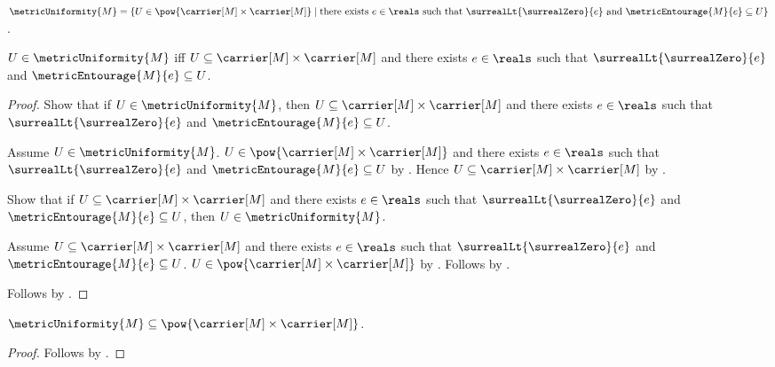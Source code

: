 \begin{definition}\label{metric_uniformity}
    $\metricUniformity{M}=
        \{U\in\pow{\carrier[M]\times\carrier[M]}\mid
            \text{there exists $e\in\reals$ such that
                $\surrealLt{\surrealZero}{e}$ and
                $\metricEntourage{M}{e}\subseteq U$}\}$.
\end{definition}

\begin{proposition}\label{metric_uniformity_iff}
    $U\in\metricUniformity{M}$ iff
        $U\subseteq\carrier[M]\times\carrier[M]$ and
        there exists $e\in\reals$ such that
            $\surrealLt{\surrealZero}{e}$ and
            $\metricEntourage{M}{e}\subseteq U$.
\end{proposition}
\begin{proof}
    Show that if $U\in\metricUniformity{M}$, then
        $U\subseteq\carrier[M]\times\carrier[M]$ and
        there exists $e\in\reals$ such that
            $\surrealLt{\surrealZero}{e}$ and
            $\metricEntourage{M}{e}\subseteq U$.
    \begin{subproof}
        Assume $U\in\metricUniformity{M}$.
        $U\in\pow{\carrier[M]\times\carrier[M]}$ and
            there exists $e\in\reals$ such that
                $\surrealLt{\surrealZero}{e}$ and
                $\metricEntourage{M}{e}\subseteq U$
            by .
        Hence $U\subseteq\carrier[M]\times\carrier[M]$
            by .
    \end{subproof}
    Show that if
        $U\subseteq\carrier[M]\times\carrier[M]$ and
        there exists $e\in\reals$ such that
            $\surrealLt{\surrealZero}{e}$ and
            $\metricEntourage{M}{e}\subseteq U$, then
        $U\in\metricUniformity{M}$.
    \begin{subproof}
        Assume
            $U\subseteq\carrier[M]\times\carrier[M]$ and
            there exists $e\in\reals$ such that
                $\surrealLt{\surrealZero}{e}$ and
                $\metricEntourage{M}{e}\subseteq U$.
        $U\in\pow{\carrier[M]\times\carrier[M]}$
            by .
        Follows by .
    \end{subproof}
    Follows by \auto.
\end{proof}

\begin{proposition}\label{metric_uniformity_type}
    $\metricUniformity{M}
        \subseteq\pow{\carrier[M]\times\carrier[M]}$.
\end{proposition}
\begin{proof}
    Follows by .
\end{proof}

